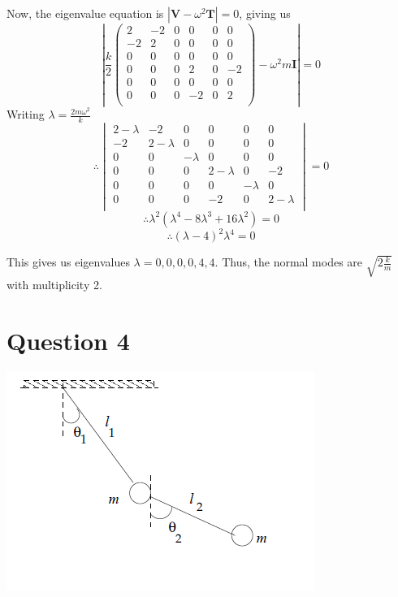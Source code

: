 \documentclass[12pt]{article}
\begin{document}
Now, the eigenvalue equation is $|\mathbf V-\omega^2 \mathbf T|=0$, giving us $$\left|\frac{k}{2}\begin{pmatrix}
 2 & -2 & 0 & 0 & 0 & 0 \\
 -2 & 2 & 0 & 0 & 0 & 0 \\
 0 & 0 & 0 & 0 & 0 & 0 \\
 0 & 0 & 0 & 2 & 0 & -2 \\
 0 & 0 & 0 & 0 & 0 & 0 \\
 0 & 0 & 0 & -2 & 0 & 2 \\
\end{pmatrix}-\omega^2 m\mathbf I\right|=0$$
Writing $\lambda=\frac{2m\omega^2}{k}$
$$\therefore\begin{vmatrix}

 2-\lambda  & -2 & 0 & 0 & 0 & 0 \\
 -2 & 2-\lambda  & 0 & 0 & 0 & 0 \\
 0 & 0 & -\lambda  & 0 & 0 & 0 \\
 0 & 0 & 0 & 2-\lambda  & 0 & -2 \\
 0 & 0 & 0 & 0 & -\lambda  & 0 \\
 0 & 0 & 0 & -2 & 0 & 2-\lambda  \\


\end{vmatrix}=0$$
$$\therefore \lambda ^2 \left(\lambda ^4-8 \lambda ^3+16 \lambda ^2\right)=0$$
   $$\therefore (\lambda -4)^2 \lambda ^4=0$$
   
   
   This gives us eigenvalues $\lambda=0,0,0,0,4,4$. Thus, the normal modes are $\boxed{\sqrt{2\frac{k}{m}} }$ with multiplicity 2.
\section{Question 4}
\includegraphics[scale=1]{4.png}
\end{document}
